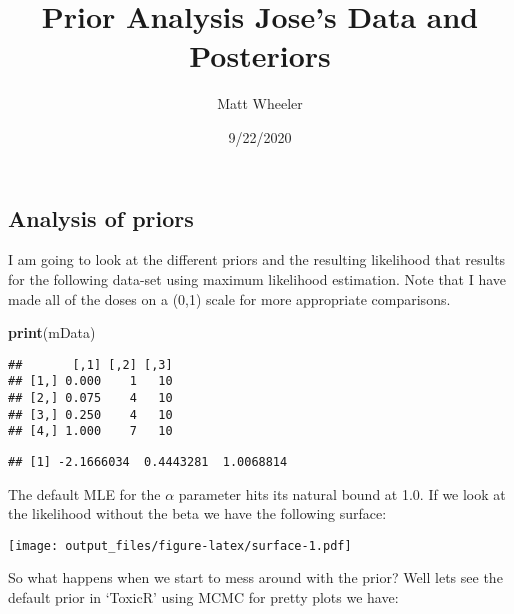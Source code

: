 \documentclass[]{article}
\title{Prior Analysis Jose's Data and Posteriors}
\author{Matt Wheeler}
\date{9/22/2020}
\newenvironment{Shaded}{\begin{snugshade}}{\end{snugshade}}
\newcommand{\DataTypeTok}[1]{\textcolor[rgb]{0.13,0.29,0.53}{#1}}
\newcommand{\DecValTok}[1]{\textcolor[rgb]{0.00,0.00,0.81}{#1}}
\newcommand{\KeywordTok}[1]{\textcolor[rgb]{0.13,0.29,0.53}{\textbf{#1}}}
\newcommand{\NormalTok}[1]{#1}
\newcommand{\OperatorTok}[1]{\textcolor[rgb]{0.81,0.36,0.00}{\textbf{#1}}}
\newcommand{\StringTok}[1]{\textcolor[rgb]{0.31,0.60,0.02}{#1}}
\begin{document}
\maketitle

\hypertarget{analysis-of-priors}{%
\subsection{Analysis of priors}\label{analysis-of-priors}}

I am going to look at the different priors and the resulting likelihood
that results for the following data-set using maximum likelihood
estimation. Note that I have made all of the doses on a (0,1) scale for
more appropriate comparisons.

\begin{Shaded}
\begin{Highlighting}[]
\KeywordTok{print}\NormalTok{(mData)}
\end{Highlighting}
\end{Shaded}

\begin{verbatim}
##       [,1] [,2] [,3]
## [1,] 0.000    1   10
## [2,] 0.075    4   10
## [3,] 0.250    4   10
## [4,] 1.000    7   10
\end{verbatim}

\begin{Shaded}
\end{Shaded}

\begin{verbatim}
## [1] -2.1666034  0.4443281  1.0068814
\end{verbatim}

The default MLE for the \(\alpha\) parameter hits its natural bound at
1.0. If we look at the likelihood without the beta we have the following
surface:

\texttt{[image: output\_files/figure-latex/surface-1.pdf]}

So what happens when we start to mess around with the prior? Well lets
see the default prior in `ToxicR' using MCMC for pretty plots we have:
\end{document}
